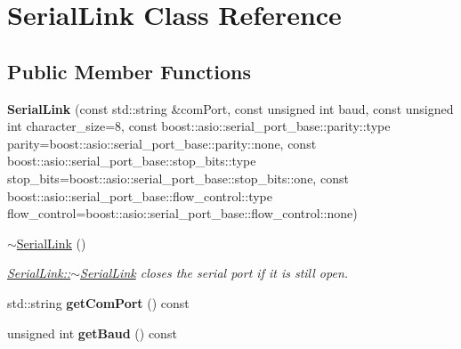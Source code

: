 \hypertarget{class_serial_link}{}\section{Serial\+Link Class Reference}
\label{class_serial_link}
\subsection*{Public Member Functions}
\begin{DoxyCompactItemize}
\item 
{\bfseries Serial\+Link} (const std\+::string \&com\+Port, const unsigned int baud, const unsigned int character\+\_\+size=8, const boost\+::asio\+::serial\+\_\+port\+\_\+base\+::parity\+::type parity=boost\+::asio\+::serial\+\_\+port\+\_\+base\+::parity\+::none, const boost\+::asio\+::serial\+\_\+port\+\_\+base\+::stop\+\_\+bits\+::type stop\+\_\+bits=boost\+::asio\+::serial\+\_\+port\+\_\+base\+::stop\+\_\+bits\+::one, const boost\+::asio\+::serial\+\_\+port\+\_\+base\+::flow\+\_\+control\+::type flow\+\_\+control=boost\+::asio\+::serial\+\_\+port\+\_\+base\+::flow\+\_\+control\+::none)\hypertarget{class_serial_link_a96aca1c125f24688b57b6fde3fbc4f6d}{}\label{class_serial_link_a96aca1c125f24688b57b6fde3fbc4f6d}

\item 
\hyperlink{class_serial_link_af9a3c0d7518e7f554f49c198411e1521}{$\sim$\+Serial\+Link} ()\hypertarget{class_serial_link_af9a3c0d7518e7f554f49c198411e1521}{}\label{class_serial_link_af9a3c0d7518e7f554f49c198411e1521}

\begin{DoxyCompactList}\small\item\em \hyperlink{class_serial_link_af9a3c0d7518e7f554f49c198411e1521}{Serial\+Link\+::$\sim$\+Serial\+Link} closes the serial port if it is still open. \end{DoxyCompactList}\item 
std\+::string {\bfseries get\+Com\+Port} () const \hypertarget{class_serial_link_a6c6d0211ec68d41c613d92c27da9679a}{}\label{class_serial_link_a6c6d0211ec68d41c613d92c27da9679a}

\item 
unsigned int {\bfseries get\+Baud} () const \hypertarget{class_serial_link_a8611ff8959587b5b629be657f71ac15c}{}\label{class_serial_link_a8611ff8959587b5b629be657f71ac15c}


\end{DoxyCompactItemize}
